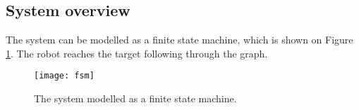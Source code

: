 \subsection{System overview}
	
	The system can be modelled as a finite state machine, which is shown on Figure \ref{fig:sys}. The robot reaches the target following through the graph.

	\begin{figure}[h]
	   \centering
   	 	\texttt{[image: fsm]}	
		\caption{The system modelled as a finite state machine.}
		\label{fig:sys}
	\end{figure}